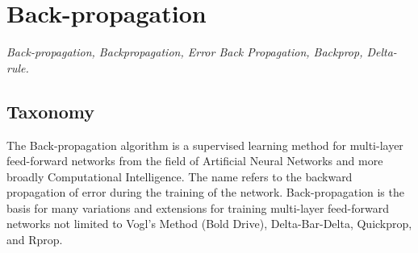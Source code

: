 

\section{Back-propagation} 
\label{sec:backpropagation}

\emph{Back-propagation, Backpropagation, Error Back Propagation, Backprop, Delta-rule.}

\subsection{Taxonomy}
The Back-propagation algorithm is a supervised learning method for multi-layer feed-forward networks from the field of Artificial Neural Networks and more broadly Computational Intelligence.
The name refers to the backward propagation of error during the training of the network. Back-propagation is the basis for many variations and extensions for training multi-layer feed-forward networks not limited to Vogl's Method (Bold Drive), Delta-Bar-Delta, Quickprop, and Rprop.

